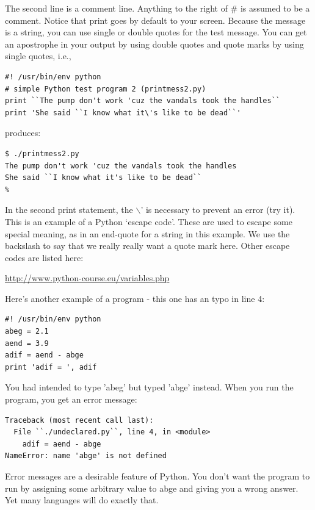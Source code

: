 \documentclass[11pt]{book}
\begin{document}
{{The second line is a comment line.  Anything to the right of \# is assumed to be a comment.
Notice that print goes by default to your screen.  Because the message is a string, you can use single or double quotes
for the test message.  You can get an apostrophe in your output by using double quotes
and quote marks by using single quotes, i.e.,

{ \color{blue} \begin{verbatim}
#! /usr/bin/env python
# simple Python test program 2 (printmess2.py)
print ``The pump don't work 'cuz the vandals took the handles``
print 'She said ``I know what it\'s like to be dead``'
\end{verbatim}}

\noindent
produces:

{ \color{blue} \begin{verbatim}
$ ./printmess2.py
The pump don't work 'cuz the vandals took the handles
She said ``I know what it's like to be dead``
%
\end{verbatim}}

\noindent
In the second print statement, the $\backslash$' is necessary to prevent an error (try it).   This is an example of a Python `escape code'.   These are used to escape some special meaning, as in an end-quote for a string in this example. We use the backslash to say that we really really want a quote mark here.   Other escape codes are listed here:

\url{http://www.python-course.eu/variables.php}

Here's another example of a program - this one has an typo in line 4:

{ \color{blue} \begin{verbatim}
#! /usr/bin/env python
abeg = 2.1
aend = 3.9
adif = aend - abge
print 'adif = ', adif
\end{verbatim}}

\noindent
You had intended to type 'abeg' but typed 'abge' instead.  When
you run the program, you get an error message:

{ \color{blue} \begin{verbatim}
Traceback (most recent call last):
  File ``./undeclared.py``, line 4, in <module>
    adif = aend - abge
NameError: name 'abge' is not defined
\end{verbatim}}

\noindent
Error messages are a desirable feature of Python.  You don't want the program
to run by assigning some arbitrary value to abge and giving you
a wrong answer.  Yet many languages will do exactly that.


}}
\end{document}
